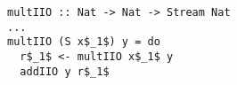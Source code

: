 \begin{figure}[!t]
  \centering
  \begin{minipage}{\columnwidth}
    \begin{lstlisting}[frame=tb]
multIIO :: Nat -> Nat -> Stream Nat
...
multIIO (S x$_1$) y = do
  r$_1$ <- multIIO x$_1$ y
  addIIO y r$_1$
    \end{lstlisting}
  \end{minipage}
\end{figure}
